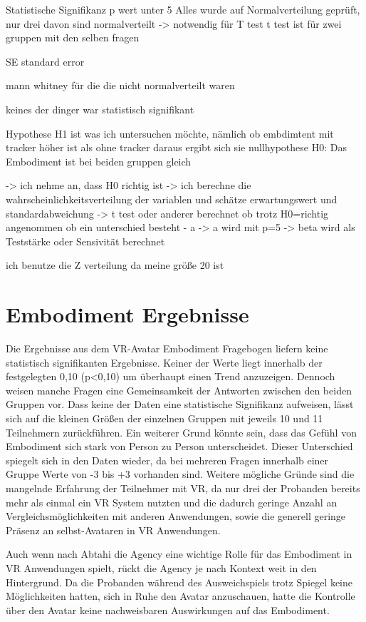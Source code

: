 Statistische Signifikanz p wert unter 5%
Alles wurde auf Normalverteilung geprüft, nur drei davon sind normalverteilt -> notwendig für T test
t test ist für zwei gruppen mit den selben fragen


SE standard error

mann whitney für die die nicht normalverteilt waren

keines der dinger war statistisch signifikant


Hypothese H1 ist was ich untersuchen möchte, nämlich ob embdimtent mit tracker höher ist als ohne tracker
daraus ergibt sich sie nullhypothese H0: Das Embodiment ist bei beiden gruppen gleich

-> ich nehme an, dass H0 richtig ist
-> ich berechne die wahrscheinlichkeitsverteilung der variablen und schätze erwartungswert und standardabweichung
-> t test oder anderer berechnet ob trotz H0=richtig angenommen ob ein unterschied besteht - a
-> a wird mit p=5%
-> beta wird als Teststärke oder Sensivität berechnet

ich benutze die Z verteilung da meine größe 20 ist


\section{Embodiment Ergebnisse}
Die Ergebnisse aus dem VR-Avatar Embodiment Fragebogen liefern keine statistisch signifikanten Ergebnisse. Keiner der Werte liegt innerhalb der festgelegten 0,10 (p<0,10) um überhaupt einen Trend anzuzeigen. Dennoch weisen manche Fragen eine Gemeinsamkeit der Antworten zwischen den beiden Gruppen vor. Dass keine der Daten eine statistische Signifikanz aufweisen, lässt sich auf die kleinen Größen der einzelnen Gruppen mit jeweils 10 und 11 Teilnehmern zurückführen. Ein weiterer Grund könnte sein, dass das Gefühl von Embodiment sich stark von Person zu Person unterscheidet. Dieser Unterschied spiegelt sich in den Daten wieder, da bei mehreren Fragen innerhalb einer Gruppe Werte von -3 bis +3 vorhanden sind.
Weitere mögliche Gründe sind die mangelnde Erfahrung der Teilnehmer mit VR, da nur drei der Probanden bereits mehr als einmal ein VR System nutzten und die dadurch geringe Anzahl an Vergleichsmöglichkeiten mit anderen Anwendungen, sowie die generell geringe Präsenz an selbst-Avataren in VR Anwendungen.

Auch wenn nach Abtahi \cite{Abtahi2019} die Agency eine wichtige Rolle für das Embodiment in VR Anwendungen spielt, rückt die Agency je nach Kontext weit in den Hintergrund. Da die Probanden während des Ausweichspiels trotz Spiegel keine Möglichkeiten hatten, sich in Ruhe den Avatar anzuschauen, hatte die Kontrolle über den Avatar keine nachweisbaren Auswirkungen auf das Embodiment.


